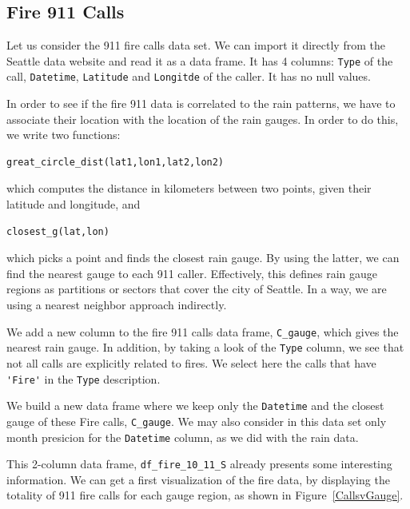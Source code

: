 \documentclass[12pt,a4paper]{article}
\begin{document}
\subsection{Fire 911 Calls}

Let us consider the 911 fire calls data set. We can import it directly from the Seattle data website and read it as a data frame. It has 4 columns: \verb|Type| of the call, \verb|Datetime|, \verb|Latitude| and \verb|Longitde| of the caller. It has no null values.

In order to see if the fire 911 data is correlated to the rain patterns, we have to associate their location with the location of the rain gauges. In order to do this, we write two functions:

\begin{verbatim}
great_circle_dist(lat1,lon1,lat2,lon2) 
\end{verbatim}

which computes the distance in kilometers between two points, given their latitude and longitude, and

\begin{verbatim}
closest_g(lat,lon) 
\end{verbatim}

which picks a point and finds the closest rain gauge. By using the latter, we can find the nearest gauge to each 911 caller. Effectively, this defines rain gauge regions as partitions or sectors that cover the city of Seattle. In a way, we are using a nearest neighbor approach indirectly. 

We add a new column to the fire 911 calls data frame, \verb|C_gauge|, which gives the nearest rain gauge. In addition, by taking a look of the \verb|Type| column, we see that not all calls are explicitly related to fires. We select here the calls that have \verb|'Fire'| in the \verb|Type| description.

We build a new data frame where we keep only the \verb|Datetime| and the closest gauge of these Fire calls, \verb|C_gauge|. We may also consider in this data set only month presicion for the \verb|Datetime| column, as we did with the rain data.

This 2-column data frame, \verb|df_fire_10_11_S| already presents some interesting information. We can get a first visualization of the fire data, by displaying the totality of 911 fire calls for each gauge region, as shown in Figure~\ref{CallsvGauge}.
\end{document}
